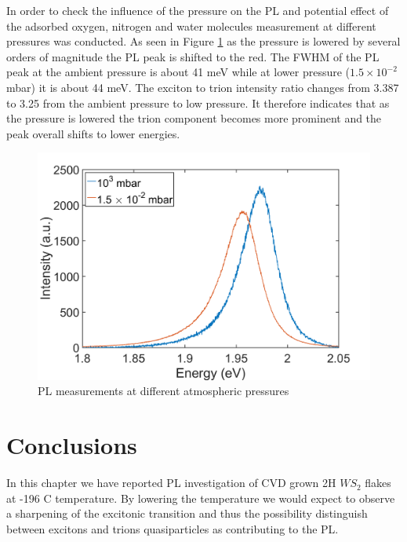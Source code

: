 In order to check the influence of the pressure on the PL and potential effect of the adsorbed oxygen, nitrogen and water molecules measurement at different pressures was conducted. As seen in Figure \ref{fig:LowTPLPressureDifference} as the pressure is lowered by several orders of magnitude the PL peak is shifted to the red. The FWHM of the PL peak at the ambient pressure is about 41 meV while at lower pressure ($1.5 \times 10^{-2}$ mbar) it is about 44 meV. The exciton to trion intensity ratio changes from 3.387 to 3.25 from the ambient pressure to low pressure. It therefore indicates that as the pressure is lowered the trion component becomes more prominent and the peak overall shifts to lower energies. 

\begin{figure}[H]
	\begin{center}
		\includegraphics[scale=0.4]{LowT/LowTPLPressureDifference.png}
		\caption{PL measurements at different atmospheric pressures}
		\label{fig:LowTPLPressureDifference}
	\end{center}
\end{figure}

\section{Conclusions}

In this chapter we have reported PL investigation of CVD grown 2H $WS_2$ flakes at -196 {\degree}C temperature. By lowering the temperature we would expect to observe a sharpening of the excitonic transition and thus the possibility distinguish between excitons and trions quasiparticles as contributing to the PL.